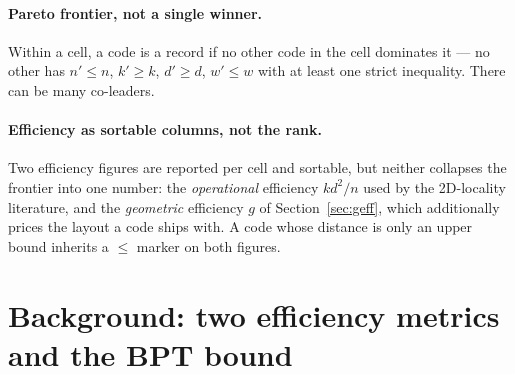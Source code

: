 \documentclass[11pt]{article}
\newcommand{\eff}{kd^2/n}
\begin{document}
	\paragraph{Pareto frontier, not a single winner.} Within a cell, a code is
	a record if no other code in the cell dominates it --- no other has
	$n'\le n$, $k'\ge k$, $d'\ge d$, $w'\le w$ with at least one strict
	inequality. There can be many co-leaders.

	\paragraph{Efficiency as sortable columns, not the rank.} Two efficiency
	figures are reported per cell and sortable, but neither collapses the
	frontier into one number: the \emph{operational} efficiency $\eff$ used
	by the 2D-locality literature, and the \emph{geometric} efficiency $g$
	of Section~\ref{sec:geff}, which additionally prices the layout a code
	ships with. A code whose distance is only an upper bound inherits a
	$\le$ marker on both figures.

	\section{Background: two efficiency metrics and the BPT bound}
\end{document}
